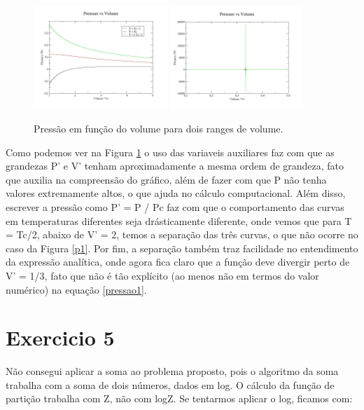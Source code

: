 \documentclass[a4wide]{report}
\begin{document}
\begin{figure}[h]
\centering
\includegraphics[width=0.45\textwidth]{v_alto2.jpg}%
\includegraphics[width=0.447\textwidth]{v_baixo2.jpg}
\caption{Pressão em função do volume para dois ranges de volume.}
\label{p2}
\end{figure}


	Como podemos ver na Figura \ref{p2} o uso das variaveis auxiliares faz com que as grandezas P' e V' tenham aproximadamente a mesma ordem de grandeza, fato que auxilia na compreensão do gráfico, além de fazer com que P não tenha valores extremamente altos, o que ajuda no cálculo computacional. Além disso, escrever a pressão como P' = P / Pc faz com que o comportamento das curvas em temperaturas diferentes seja drásticamente diferente, onde vemos que para T = Tc/2, abaixo de V' = 2, temos a separação das três curvas, o que não ocorre no caso da Figura \ref{p1}. Por fim, a separação também traz facilidade no entendimento da expressão analítica, onde agora fica claro que a função deve divergir perto de V' = 1/3, fato que não é tão explícito (ao menos não em termos do valor numérico) na equação \ref{pressao1}.
	


\section*{Exercicio 5}
Não consegui aplicar a soma ao problema proposto, pois o algoritmo da soma trabalha com a soma de dois números, dados em log. O cálculo da função de partição trabalha com Z, não com logZ. Se tentarmos aplicar o log, ficamos com:
\end{document}
